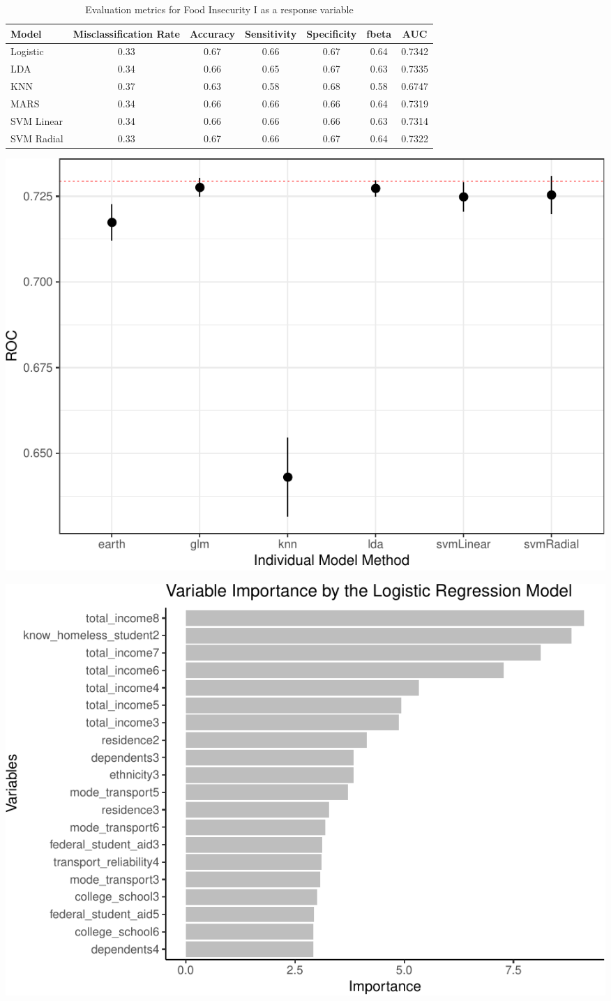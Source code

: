 \documentclass[
  10pt,
]{article}
\begin{document}
\begin{table}[H]

\caption{\label{tab:unnamed-chunk-15}Evaluation metrics for Food Insecurity I  as a response variable}
\centering
\fontsize{12}{14}\selectfont
\begin{tabular}[t]{lcccccc}
\toprule
Model & Misclassification Rate & Accuracy & Sensitivity & Specificity & fbeta & AUC\\
\midrule
Logistic & 0.33 & 0.67 & 0.66 & 0.67 & 0.64 & 0.7342\\
LDA & 0.34 & 0.66 & 0.65 & 0.67 & 0.63 & 0.7335\\
KNN & 0.37 & 0.63 & 0.58 & 0.68 & 0.58 & 0.6747\\
MARS & 0.34 & 0.66 & 0.66 & 0.66 & 0.64 & 0.7319\\
SVM Linear & 0.34 & 0.66 & 0.66 & 0.66 & 0.63 & 0.7314\\
SVM Radial & 0.33 & 0.67 & 0.66 & 0.67 & 0.64 & 0.7322\\
\bottomrule
\end{tabular}
\end{table}

\begin{center}\includegraphics{phase2_report_files/figure-latex/unnamed-chunk-16-1} \end{center}

\begin{center}\includegraphics{phase2_report_files/figure-latex/unnamed-chunk-17-1} \end{center}
\end{document}
